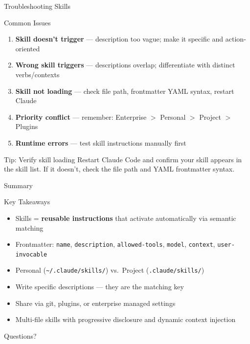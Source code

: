 \documentclass[aspectratio=169]{beamer}
\begin{document}
\begin{frame}{Troubleshooting Skills}
\begin{alertblock}{Common Issues}
\begin{enumerate}
  \item \textbf{Skill doesn't trigger} --- description too vague; make it specific and action-oriented
  \item \textbf{Wrong skill triggers} --- descriptions overlap; differentiate with distinct verbs/contexts
  \item \textbf{Skill not loading} --- check file path, frontmatter YAML syntax, restart Claude
  \item \textbf{Priority conflict} --- remember: Enterprise $>$ Personal $>$ Project $>$ Plugins
  \item \textbf{Runtime errors} --- test skill instructions manually first
\end{enumerate}
\end{alertblock}

\bigskip
\begin{exampleblock}{Tip: Verify skill loading}
Restart Claude Code and confirm your skill appears in the skill list. If it doesn't, check the file path and YAML frontmatter syntax.
\end{exampleblock}
\end{frame}

\begin{frame}{Summary}
\begin{block}{Key Takeaways}
\begin{itemize}
  \item Skills = \textbf{reusable instructions} that activate automatically via semantic matching
  \item Frontmatter: \texttt{name}, \texttt{description}, \texttt{allowed-tools}, \texttt{model}, \texttt{context}, \texttt{user-invocable}
  \item Personal (\texttt{\textasciitilde/.claude/skills/}) vs.\ Project (\texttt{.claude/skills/})
  \item Write specific descriptions --- they are the matching key
  \item Share via git, plugins, or enterprise managed settings
  \item Multi-file skills with progressive disclosure and dynamic context injection
\end{itemize}
\end{block}

\vfill
\centering
\Large\color{popblue} Questions?
\end{frame}
\end{document}
